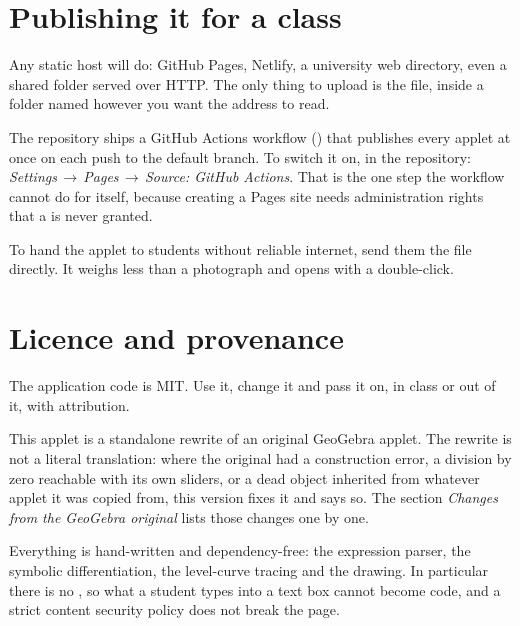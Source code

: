 
\section{Publishing it for a class}

Any static host will do: GitHub Pages, Netlify, a university web directory,
even a shared folder served over HTTP. The only thing to upload is the
 file, inside a folder named however you want the address to
read.

The repository ships a GitHub Actions workflow
() that publishes every applet at once on each
push to the default branch. To switch it on, in the repository:
\emph{Settings\,$\rightarrow$\,Pages\,$\rightarrow$\,Source: GitHub Actions}.
That is the one step the workflow cannot do for itself, because creating a Pages
site needs administration rights that a  is never granted.

\begin{amnote}
To hand the applet to students without reliable internet, send them the
 file directly. It weighs less than a photograph and opens with
a double-click.
\end{amnote}

\section{Licence and provenance}

The application code is MIT. Use it, change it and pass it on, in class or out
of it, with attribution.

This applet is a standalone rewrite of an original GeoGebra applet. The rewrite
is not a literal translation: where the original had a construction error, a
division by zero reachable with its own sliders, or a dead object inherited from
whatever applet it was copied from, this version fixes it and says so. The
section \emph{Changes from the GeoGebra original} lists those changes one by
one.

Everything is hand-written and dependency-free: the expression parser, the
symbolic differentiation, the level-curve tracing and the drawing. In
particular there is no , so what a student types into a text box
cannot become code, and a strict content security policy does not break the
page.
